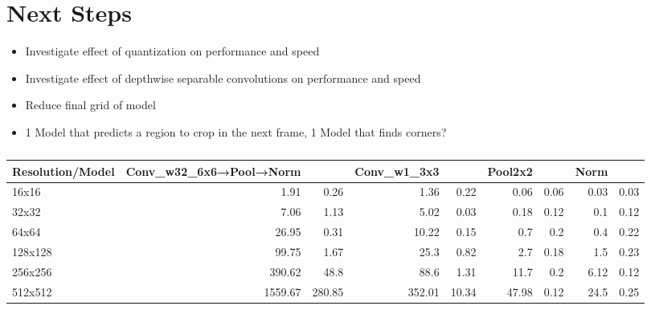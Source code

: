 \documentclass{article}
\begin{document}
\section{Next Steps}
\begin{itemize}
	\item Investigate effect of quantization on performance and speed
	\item Investigate effect of depthwise separable convolutions on performance and speed
	\item Reduce final grid of model
	\item 1 Model that predicts a region to crop in the next frame, 1 Model that finds corners?
\end{itemize}

\newpage
\appendix

\begin{table}[htbp]
	\caption{}
	\begin{tabular}{|l|r|r|r|r|r|r|r|r|}
		\hline
		Resolution/Model & \multicolumn{1}{l|}{Conv\_w32\_6x6→Pool→Norm} & \multicolumn{1}{l|}{} & \multicolumn{1}{l|}{Conv\_w1\_3x3} & \multicolumn{1}{l|}{} & \multicolumn{1}{l|}{Pool2x2} & \multicolumn{1}{l|}{} & \multicolumn{1}{l|}{Norm} & \multicolumn{1}{l|}{} \\ \hline
		16x16 & 1.91 & 0.26 & 1.36 & 0.22 & 0.06 & 0.06 & 0.03 & 0.03 \\ \hline
		32x32 & 7.06 & 1.13 & 5.02 & 0.03 & 0.18 & 0.12 & 0.1 & 0.12 \\ \hline
		64x64 & 26.95 & 0.31 & 10.22 & 0.15 & 0.7 & 0.2 & 0.4 & 0.22 \\ \hline
		128x128 & 99.75 & 1.67 & 25.3 & 0.82 & 2.7 & 0.18 & 1.5 & 0.23 \\ \hline
		256x256 & 390.62 & 48.8 & 88.6 & 1.31 & 11.7 & 0.2 & 6.12 & 0.12 \\ \hline
		512x512 & 1559.67 & 280.85 & 352.01 & 10.34 & 47.98 & 0.12 & 24.5 & 0.25 \\ \hline
	\end{tabular}
	\label{}
\end{table}
\end{document}
